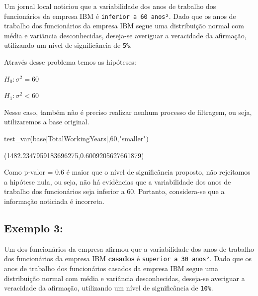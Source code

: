 \documentclass[
  letterpaper,
  DIV=11,
  numbers=noendperiod]{scrreprt}
\newenvironment{Shaded}{\begin{snugshade}}{\end{snugshade}}
\newcommand{\DecValTok}[1]{\textcolor[rgb]{0.68,0.00,0.00}{#1}}
\newcommand{\NormalTok}[1]{\textcolor[rgb]{0.00,0.23,0.31}{#1}}
\newcommand{\StringTok}[1]{\textcolor[rgb]{0.13,0.47,0.30}{#1}}
\begin{document}
Um jornal local noticiou que a variabilidade dos anos de trabalho dos
funcionários da empresa IBM é \texttt{inferior\ a\ 60\ anos²}. Dado que
os anos de trabalho dos funcionários da empresa IBM segue uma
distribuição normal com média e variância desconhecidas, deseja-se
averiguar a veracidade da afirmação, utilizando um nível de
significância de \texttt{5\%}.

Através desse problema temos as hipóteses:

\(H_{0} : \sigma^{2} = 60\)

\(H_{1} : \sigma^{2} < 60\)

Nesse caso, também não é preciso realizar nenhum processo de filtragem,
ou seja, utilizaremos a base original.

\begin{Shaded}
\begin{Highlighting}[]
\NormalTok{test\_var(base[}\StringTok{\textquotesingle{}TotalWorkingYears\textquotesingle{}}\NormalTok{],}\DecValTok{60}\NormalTok{,}\StringTok{"smaller"}\NormalTok{)}
\end{Highlighting}
\end{Shaded}

\begin{tcolorbox}[enhanced jigsaw, breakable, leftrule=.75mm, left=2mm, opacityback=0, bottomrule=.15mm, toprule=.15mm, rightrule=.15mm, arc=.35mm, colback=white]

(1482.2347959183696275,0.6009205627661879)

\end{tcolorbox}

Como p-valor = 0.6 é maior que o nível de significância proposto, não
rejeitamos a hipótese nula, ou seja, não há evidências que a
variabilidade dos anos de trabalho dos funcionários seja inferior a 60.
Portanto, considera-se que a informação noticiada é incorreta.

\hypertarget{exemplo-3-2}{%
\subsection{Exemplo 3:}\label{exemplo-3-2}}

Um dos funcionários da empresa afirmou que a variabilidade dos anos de
trabalho dos funcionários da empresa IBM \textbf{casados} é
\texttt{superior\ a\ 30\ anos²}. Dado que os anos de trabalho dos
funcionários casados da empresa IBM segue uma distribuição normal com
média e variância desconhecidas, deseja-se averiguar a veracidade da
afirmação, utilizando um nível de significância de \texttt{10\%}.
\end{document}

